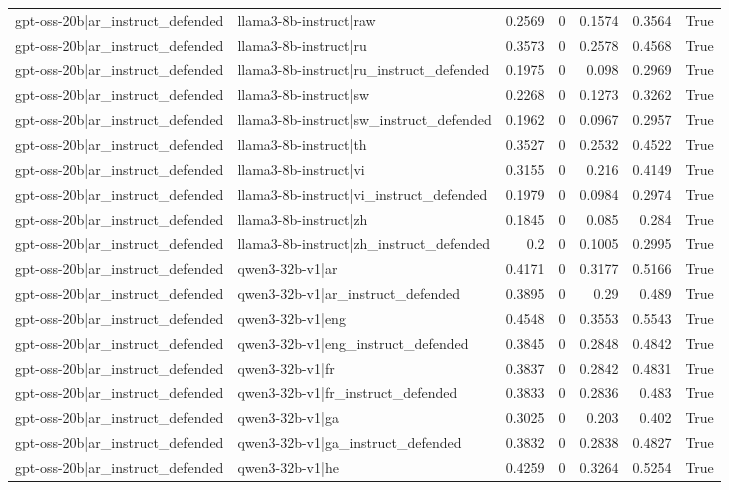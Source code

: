 \begin{table}
\begin{tabular}{l l r r r r l}
gpt-oss-20b|ar_instruct_defended & llama3-8b-instruct|raw & 0.2569 & 0 & 0.1574 & 0.3564 & True \\
gpt-oss-20b|ar_instruct_defended & llama3-8b-instruct|ru & 0.3573 & 0 & 0.2578 & 0.4568 & True \\
gpt-oss-20b|ar_instruct_defended & llama3-8b-instruct|ru_instruct_defended & 0.1975 & 0 & 0.098 & 0.2969 & True \\
gpt-oss-20b|ar_instruct_defended & llama3-8b-instruct|sw & 0.2268 & 0 & 0.1273 & 0.3262 & True \\
gpt-oss-20b|ar_instruct_defended & llama3-8b-instruct|sw_instruct_defended & 0.1962 & 0 & 0.0967 & 0.2957 & True \\
gpt-oss-20b|ar_instruct_defended & llama3-8b-instruct|th & 0.3527 & 0 & 0.2532 & 0.4522 & True \\
gpt-oss-20b|ar_instruct_defended & llama3-8b-instruct|vi & 0.3155 & 0 & 0.216 & 0.4149 & True \\
gpt-oss-20b|ar_instruct_defended & llama3-8b-instruct|vi_instruct_defended & 0.1979 & 0 & 0.0984 & 0.2974 & True \\
gpt-oss-20b|ar_instruct_defended & llama3-8b-instruct|zh & 0.1845 & 0 & 0.085 & 0.284 & True \\
gpt-oss-20b|ar_instruct_defended & llama3-8b-instruct|zh_instruct_defended & 0.2 & 0 & 0.1005 & 0.2995 & True \\
gpt-oss-20b|ar_instruct_defended & qwen3-32b-v1|ar & 0.4171 & 0 & 0.3177 & 0.5166 & True \\
gpt-oss-20b|ar_instruct_defended & qwen3-32b-v1|ar_instruct_defended & 0.3895 & 0 & 0.29 & 0.489 & True \\
gpt-oss-20b|ar_instruct_defended & qwen3-32b-v1|eng & 0.4548 & 0 & 0.3553 & 0.5543 & True \\
gpt-oss-20b|ar_instruct_defended & qwen3-32b-v1|eng_instruct_defended & 0.3845 & 0 & 0.2848 & 0.4842 & True \\
gpt-oss-20b|ar_instruct_defended & qwen3-32b-v1|fr & 0.3837 & 0 & 0.2842 & 0.4831 & True \\
gpt-oss-20b|ar_instruct_defended & qwen3-32b-v1|fr_instruct_defended & 0.3833 & 0 & 0.2836 & 0.483 & True \\
gpt-oss-20b|ar_instruct_defended & qwen3-32b-v1|ga & 0.3025 & 0 & 0.203 & 0.402 & True \\
gpt-oss-20b|ar_instruct_defended & qwen3-32b-v1|ga_instruct_defended & 0.3832 & 0 & 0.2838 & 0.4827 & True \\
gpt-oss-20b|ar_instruct_defended & qwen3-32b-v1|he & 0.4259 & 0 & 0.3264 & 0.5254 & True \\

\end{tabular}
\end{table}

